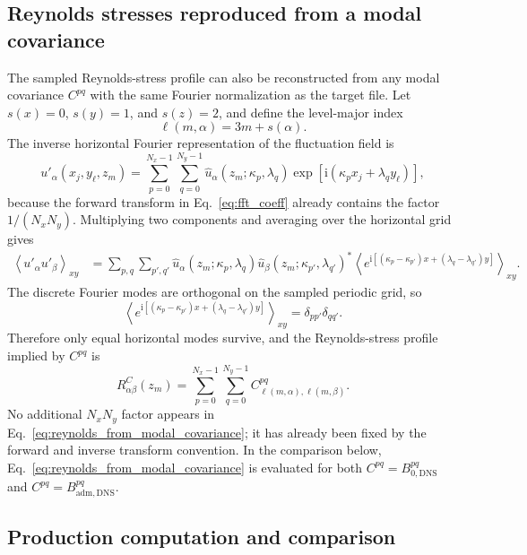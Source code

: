 \documentclass[11pt]{article}
\newcommand{\ii}{\mathrm{i}}
\newcommand{\Bzero}{B_{0,\mathrm{DNS}}}
\newcommand{\Badm}{B_{\mathrm{adm},\mathrm{DNS}}}
\begin{document}
\subsection{Reynolds stresses reproduced from a modal covariance}

The sampled Reynolds-stress profile can also be reconstructed from any modal
covariance \(C^{pq}\) with the same Fourier normalization as the target file.
Let \(s(x)=0\), \(s(y)=1\), and \(s(z)=2\), and define the level-major index
\[
  \ell(m,\alpha)=3m+s(\alpha).
\]
The inverse horizontal Fourier representation of the fluctuation field is
\[
  u'_\alpha(x_j,y_\ell,z_m)
  =
  \sum_{p=0}^{N_x-1}
  \sum_{q=0}^{N_y-1}
  \widehat{u}_\alpha(z_m;\kappa_p,\lambda_q)
  \exp\left[\ii(\kappa_p x_j+\lambda_q y_\ell)\right],
  \label{eq:inverse_fft_for_reynolds}
\]
because the forward transform in Eq.~\eqref{eq:fft_coeff} already contains the
factor \(1/(N_xN_y)\). Multiplying two components and averaging over the
horizontal grid gives
\begin{align}
  \left\langle
  u'_\alpha u'_\beta
  \right\rangle_{xy}
  &=
  \sum_{p,q}
  \sum_{p',q'}
  \widehat{u}_\alpha(z_m;\kappa_p,\lambda_q)
  \widehat{u}_\beta(z_m;\kappa_{p'},\lambda_{q'})^*
  \left\langle
    e^{\ii[(\kappa_p-\kappa_{p'})x
          +(\lambda_q-\lambda_{q'})y]}
  \right\rangle_{xy}.
  \label{eq:reynolds_parseval_start}
\end{align}
The discrete Fourier modes are orthogonal on the sampled periodic grid, so
\[
  \left\langle
    e^{\ii[(\kappa_p-\kappa_{p'})x
          +(\lambda_q-\lambda_{q'})y]}
  \right\rangle_{xy}
  =
  \delta_{pp'}\delta_{qq'}.
\]
Therefore only equal horizontal modes survive, and the Reynolds-stress profile
implied by \(C^{pq}\) is
\begin{equation}
  R_{\alpha\beta}^{C}(z_m)
  =
  \sum_{p=0}^{N_x-1}
  \sum_{q=0}^{N_y-1}
  C^{pq}_{\ell(m,\alpha),\ell(m,\beta)}.
  \label{eq:reynolds_from_modal_covariance}
\end{equation}
No additional \(N_xN_y\) factor appears in Eq.~\eqref{eq:reynolds_from_modal_covariance};
it has already been fixed by the forward and inverse transform convention.
In the comparison below, Eq.~\eqref{eq:reynolds_from_modal_covariance} is
evaluated for both \(C^{pq}=\Bzero^{pq}\) and
\(C^{pq}=\Badm^{pq}\).

\subsection{Production computation and comparison}
\end{document}
